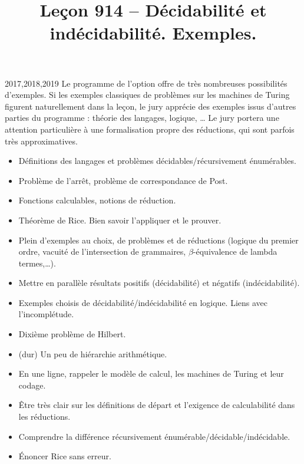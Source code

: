 \documentclass{agregfiche}
\title{Leçon 914 -- Décidabilité et indécidabilité. Exemples.}
\begin{document}
\maketitle

\secrapports

\begin{rapport}{2017,2018,2019}
Le programme de l'option offre de très nombreuses possibilités d'exemples. Si les exemples classiques de problèmes sur les machines de Turing figurent naturellement dans la leçon, le jury apprécie des exemples issus d'autres parties du programme : théorie des langages, logique, \dots
Le jury portera une attention particulière à une formalisation propre des réductions, qui sont parfois très approximatives.
\end{rapport}

\secindispensables

\begin{itemize}
\item Définitions des langages et problèmes décidables/récursivement énumérables.
\item Problème de l'arrêt, problème de correspondance de Post.
\item Fonctions calculables, notions de réduction.
\end{itemize}

\secasavoir

\begin{itemize}
    \item Théorème de Rice. Bien savoir l'appliquer et le prouver.
    \item Plein d'exemples au choix, de problèmes et de réductions (logique du premier ordre, vacuité de l'intersection de grammaires, $\beta$-équivalence de lambda termes,\dots).
\end{itemize}


\secidees
\begin{itemize}
\item Mettre en parallèle résultats positifs (décidabilité) et négatifs (indécidabilité).
\item Exemples choisis de décidabilité/indécidabilité en logique. Liens avec l'incomplétude.
\item Dixième problème de Hilbert.
\item (dur) Un peu de hiérarchie arithmétique.
\end{itemize}

\secpieges

\begin{itemize}
\item En une ligne, rappeler le modèle de calcul, les machines de Turing et leur codage.
\item Être très clair sur les définitions de départ et l'exigence de calculabilité dans les réductions.
\item Comprendre la différence récursivement énumérable/décidable/indécidable.
\item Énoncer Rice sans erreur.
\end{itemize}
\end{document}
